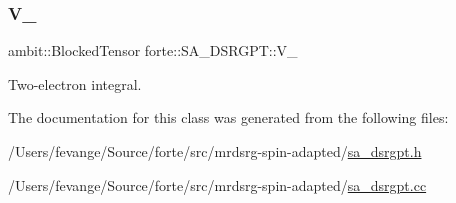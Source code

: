\subsubsection{\texorpdfstring{V\+\_\+}{V\_}}
{\footnotesize\ttfamily ambit\+::\+Blocked\+Tensor forte\+::\+S\+A\+\_\+\+D\+S\+R\+G\+P\+T\+::\+V\+\_\+\hspace{0.3cm}{\ttfamily [protected]}}



Two-\/electron integral. 



The documentation for this class was generated from the following files\+:\begin{DoxyCompactItemize}
\item 
/\+Users/fevange/\+Source/forte/src/mrdsrg-\/spin-\/adapted/\mbox{\hyperlink{sa__dsrgpt_8h}{sa\+\_\+dsrgpt.\+h}}\item 
/\+Users/fevange/\+Source/forte/src/mrdsrg-\/spin-\/adapted/\mbox{\hyperlink{sa__dsrgpt_8cc}{sa\+\_\+dsrgpt.\+cc}}\end{DoxyCompactItemize}
